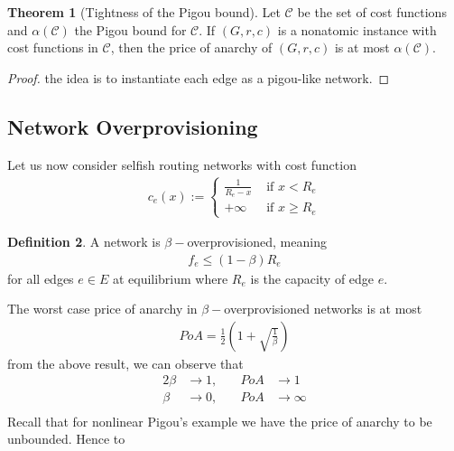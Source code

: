 \documentclass[a4paper,10pt]{article}
\theoremstyle{definition}
\newtheorem{thm}{Theorem}[section]
\newtheorem{defn}[thm]{Definition}
\begin{document}
\begin{thm}[Tightness of the Pigou bound]
Let $\mathcal{C}$ be the set of cost functions and $\alpha(\mathcal{C})$ the Pigou bound for $\mathcal{C}$. If $(G,r,c)$ is a nonatomic instance with cost functions in $\mathcal{C}$, then the price of anarchy of $(G,r,c)$ is at most $\alpha(\mathcal{C})$.
\begin{proof}
the idea is to instantiate each edge as a pigou-like network.
\end{proof}
\end{thm}



\subsection{Network Overprovisioning}
Let us now consider selfish routing networks with cost function
\begin{align*}
c_e(x):=\begin{cases}
\frac{1}{R_e-x} &\text{ if } x < R_e\\
+\infty & \text{ if }x \geq R_e
\end{cases}
\end{align*}
\begin{defn}
A network is $\beta-$overprovisioned, meaning
\begin{align*}
f_e\leq (1-\beta)R_e
\end{align*}
for all edges $e \in E$ at equilibrium where $R_e$ is the capacity of edge $e$.
\end{defn}
The worst case price of anarchy in $\beta-$overprovisioned networks is at most
\begin{align*}
PoA = \frac{1}{2}\left(1+\sqrt{\frac{1}{\beta}}\right)
\end{align*}
from the above result, we can observe that
\begin{alignat*}{2}
\beta &\to 1,\quad &PoA &\to 1\\
\beta &\to 0, \quad&PoA &\to \infty\\
\end{alignat*}
Recall that for nonlinear Pigou's example we have the price of anarchy to be unbounded. Hence to 
\end{document}
